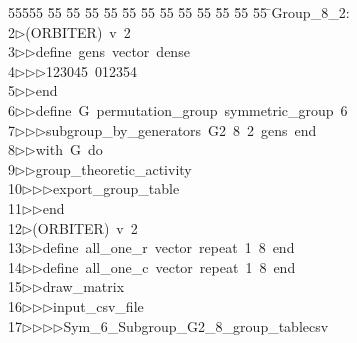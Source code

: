 %
%
\begin{tabbing}
55555 \= 55 \= 55 \= 55 \= 55 \= 55 \= 55 \= 55 \= 55 \= 55 \= 55 \= 55 \= 55 \= \>Group\_8\_2:\\[0pt]
2\>$\triangleright$\>(ORBITER)\ v\ 2\ \\[0pt]
3\>$\triangleright$\>$\triangleright$\>define\ gens\ vector\ dense\ \\[0pt]
4\>$\triangleright$\>$\triangleright$\>$\triangleright$\>123045\ 012354\ \\[0pt]
5\>$\triangleright$\>$\triangleright$\>end\ \\[0pt]
6\>$\triangleright$\>$\triangleright$\>define\ G\ permutation\_group\ symmetric\_group\ 6\ \\[0pt]
7\>$\triangleright$\>$\triangleright$\>$\triangleright$\>subgroup\_by\_generators\ G2\ 8\ 2\ gens\ end\ \\[0pt]
8\>$\triangleright$\>$\triangleright$\>with\ G\ do\ \\[0pt]
9\>$\triangleright$\>$\triangleright$\>group\_theoretic\_activity\ \\[0pt]
10\>$\triangleright$\>$\triangleright$\>$\triangleright$\>export\_group\_table\ \\[0pt]
11\>$\triangleright$\>$\triangleright$\>end\\[0pt]
12\>$\triangleright$\>(ORBITER)\ v\ 2\ \\[0pt]
13\>$\triangleright$\>$\triangleright$\>define\ all\_one\_r\ vector\ repeat\ 1\ 8\ end\ \\[0pt]
14\>$\triangleright$\>$\triangleright$\>define\ all\_one\_c\ vector\ repeat\ 1\ 8\ end\ \\[0pt]
15\>$\triangleright$\>$\triangleright$\>draw\_matrix\ \\[0pt]
16\>$\triangleright$\>$\triangleright$\>$\triangleright$\>input\_csv\_file\ \\[0pt]
17\>$\triangleright$\>$\triangleright$\>$\triangleright$\>$\triangleright$\>Sym\_6\_Subgroup\_G2\_8\_group\_tablecsv\ \\[0pt]

\end{tabbing}
